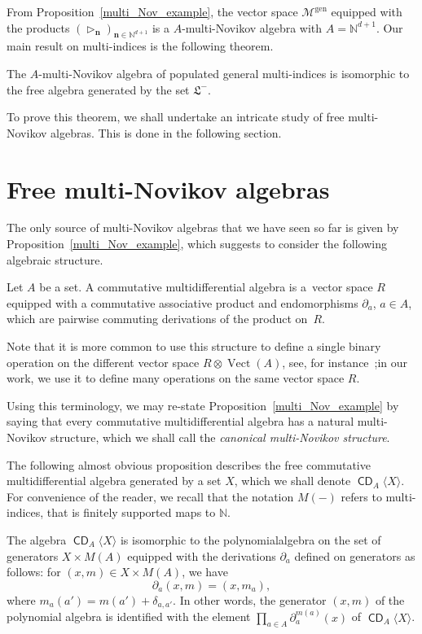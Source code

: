 \documentclass[AHL,Unicode,longabstracts]{cedram}
\newcommand{\bn}{\mathbf{n}}
\newcommand{\mcM}{\mathcal{M}}
\newcommand{\mfL}{\mathfrak{L}}
\newcommand{\bbN}{\mathbb{N}}
\newcommand{\genn}{\mathrm{gen}}
\DeclareMathOperator{\CDi}{\mathsf{CD}}
\DeclareMathOperator{\Vect}{Vect}
\begin{document}
From Proposition~\ref{multi_Nov_example}, the vector space $\mcM^{\genn}$ equipped with the products $ (\triangleright_{\bn})_{\bn \in \bbN^{d+1}} $ is a $A$-multi-Novikov algebra with $ A = \bbN^{d+1}$. Our main result on multi-indices is the following theorem.

\begin{theo}\label{main_theorem_multi_indices}
The $A$-multi-Novikov algebra of populated general multi-indices is isomorphic to the free algebra generated by the set $\mfL^-$.
\end{theo}

To prove this theorem, we shall undertake an intricate study of free multi-Novikov algebras. This is done in the following section.

\section{Free multi-Novikov algebras}\label{sec::3}
The only source of multi-Novikov algebras that we have seen so far is given by Proposition~\ref{multi_Nov_example}, which suggests to consider the following algebraic structure.

\begin{defi}
Let $A$ be a set. A commutative multidifferential algebra is a~vector space $R$ equipped with a commutative associative product and endomorphisms $\partial_a$, $a\in A$, which are pairwise commuting derivations of the product on~$R$.
\end{defi}

Note that it is more common to use this structure to define a single binary operation on the different vector space $R\otimes\Vect(A)$, see, for instance~\cite[Section~2.1]{Bur};\linebreak in our work, we use it to define many operations on the same vector space $R$.

Using this terminology, we may re-state Proposition~\ref{multi_Nov_example} by saying that every commutative multidifferential algebra has a natural multi-Novikov structure, which we shall call the \emph{canonical multi-Novikov structure}.

The following almost obvious proposition describes the free commutative multidifferential algebra generated by a set $X$, which we shall denote $\CDi_A\langle X\rangle$. For convenience of the reader, we recall that the notation $M(-)$ refers to multi-indices, that is finitely supported maps to $\bbN$.

\begin{prop}
The algebra $\CDi_A\langle X\rangle$ is isomorphic to the polynomial\linebreak algebra on the set of generators $X\times M(A)$ equipped with the derivations $\partial_a$ defined on generators as follows: for $(x,m)\in X\times M(A)$, we have
\[
\partial_a(x,m)=(x,m_a),
\]
where $m_a(a')=m(a')+\delta_{a,a'}$. In other words, the generator $(x,m)$ of the polynomial algebra is identified with the element $\prod_{a\in A}\partial_a^{m(a)}(x)$ of $\CDi_A\langle X\rangle$.
\end{prop}
\end{document}
